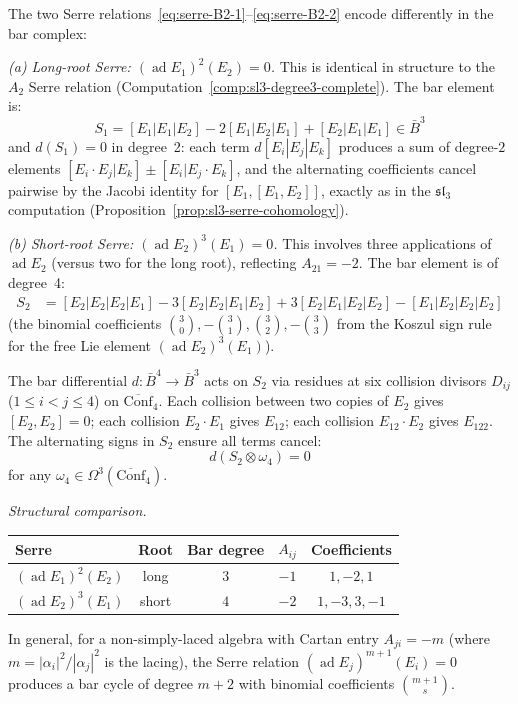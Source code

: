 \begin{computation}
\label{comp:B2-serre}

The two Serre relations~\eqref{eq:serre-B2-1}--\eqref{eq:serre-B2-2}
encode differently in the bar complex:

\emph{(a) Long-root Serre: $(\operatorname{ad} E_1)^2(E_2) = 0$.}
This is identical in structure to the $A_2$ Serre relation
(Computation~\ref{comp:sl3-degree3-complete}).  The bar element is:
\[
S_1 = [E_1|E_1|E_2] - 2[E_1|E_2|E_1] + [E_2|E_1|E_1]
\in \bar{B}^3
\]
and $d(S_1) = 0$ in degree~2: each term $d[E_i|E_j|E_k]$ produces a sum of degree-$2$ elements $[E_i \cdot E_j | E_k] \pm [E_i | E_j \cdot E_k]$, and the alternating coefficients cancel pairwise by the Jacobi identity for $[E_1, [E_1, E_2]]$, exactly as in the $\mathfrak{sl}_3$ computation (Proposition~\ref{prop:sl3-serre-cohomology}).

\emph{(b) Short-root Serre: $(\operatorname{ad} E_2)^3(E_1) = 0$.}
This involves three applications of $\operatorname{ad} E_2$
(versus two for the long root), reflecting $A_{21} = -2$.  The bar element
is of degree~4:
\begin{align*}
S_2 &= [E_2|E_2|E_2|E_1]
- 3[E_2|E_2|E_1|E_2]
+ 3[E_2|E_1|E_2|E_2]
- [E_1|E_2|E_2|E_2]
\end{align*}
(the binomial coefficients $\binom{3}{0}, -\binom{3}{1}, \binom{3}{2}, -\binom{3}{3}$ from the Koszul sign rule for the free Lie element $(\operatorname{ad} E_2)^3(E_1)$).

The bar differential $d\colon \bar{B}^4 \to \bar{B}^3$ acts on $S_2$
via residues at six collision divisors $D_{ij}$ ($1 \leq i < j \leq 4$)
on $\overline{\mathrm{Conf}}_4$.  Each collision between two copies of $E_2$
gives $[E_2, E_2] = 0$; each collision $E_2 \cdot E_1$ gives $E_{12}$;
each collision $E_{12} \cdot E_2$ gives $E_{122}$.  The alternating
signs in $S_2$ ensure all terms cancel:
\begin{equation}
d(S_2 \otimes \omega_4) = 0
\end{equation}
for any $\omega_4 \in \Omega^3(\overline{\mathrm{Conf}}_4)$.

\emph{Structural comparison.}
\begin{center}
\renewcommand{\arraystretch}{1.2}
\begin{tabular}{lcccc}
\textbf{Serre} & \textbf{Root} & \textbf{Bar degree} & \textbf{$A_{ij}$} &
\textbf{Coefficients} \\
\hline
$(\operatorname{ad} E_1)^2(E_2)$ & long & $3$ & $-1$ & $1, -2, 1$ \\
$(\operatorname{ad} E_2)^3(E_1)$ & short & $4$ & $-2$ & $1, -3, 3, -1$
\end{tabular}
\end{center}
In general, for a non-simply-laced algebra with Cartan entry $A_{ji} = -m$
(where $m = |\alpha_i|^2/|\alpha_j|^2$ is the lacing), the Serre relation
$(\operatorname{ad} E_j)^{m+1}(E_i) = 0$ produces a bar cycle
of degree $m+2$ with binomial coefficients $\binom{m+1}{s}$.
\end{computation}

